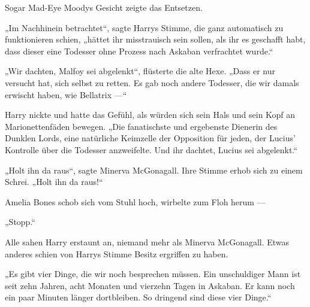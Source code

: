 Sogar Mad-Eye Moodys Gesicht zeigte das Entsetzen.

„Im Nachhinein betrachtet“, sagte Harrys Stimme, die ganz automatisch zu funktionieren schien, „hättet ihr misstrauisch sein sollen, als ihr es geschafft habt, dass dieser eine Todesser ohne Prozess nach Askaban verfrachtet wurde.“

„Wir dachten, Malfoy sei abgelenkt“, flüsterte die alte Hexe.
„Dass er nur versucht hat, sich selbst zu retten. Es gab noch andere Todesser, die wir damals erwischt haben, wie Bellatrix —“

Harry nickte und hatte das Gefühl, als würden sich sein Hals und sein Kopf an Marionettenfäden bewegen.
„Die fanatischste und ergebenste Dienerin des Dunklen Lords, eine natürliche Keimzelle der Opposition für jeden, der Lucius’ Kontrolle über die Todesser anzweifelte. Und ihr dachtet, Lucius sei abgelenkt.“

„Holt ihn da raus“, sagte Minerva McGonagall. Ihre Stimme erhob sich zu einem Schrei.
„Holt ihn da raus!“

Amelia Bones schob sich vom Stuhl hoch, wirbelte zum Floh herum —

„Stopp.“

Alle sahen Harry erstaunt an, niemand mehr als Minerva McGonagall. Etwas anderes schien von Harrys Stimme Besitz ergriffen zu haben.

„Es gibt vier Dinge, die wir noch besprechen müssen. Ein unschuldiger Mann ist seit zehn Jahren, acht Monaten und vierzehn Tagen in Askaban. Er kann noch ein paar Minuten länger dortbleiben. So dringend sind diese vier Dinge.“

